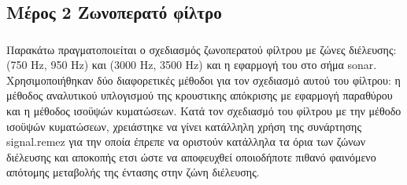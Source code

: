 \documentclass[letterpaper,10pt,english]{sphinxmanual}
\begin{document}
\noindent{}


\subsection*{Μέρος 2 Ζωνοπερατό φίλτρο}
\label{\detokenize{Exercise2_2:id1}}\label{\detokenize{Exercise2_2::doc}}

\subsubsection*{}
\label{\detokenize{Exercise2_2:hz-950-hz-3000-hz-3500-hz}}
\sphinxAtStartPar
Παρακάτω πραγματοποιείται ο σχεδιασμός ζωνοπερατού φίλτρου με ζώνες διέλευσης: (750 Hz, 950 Hz) και (3000 Hz, 3500 Hz) και η εφαρμογή του στο σήμα sonar. Χρησιμοποιήθηκαν δύο διαφορετικές μέθοδοι για τον σχεδιασμό αυτού του φίλτρου: η μέθοδος αναλυτικού υπλογισμού της κρουστικης απόκρισης με εφαρμογή παραθύρου και η μέθοδος ισοϋψών κυματώσεων. Κατά τον σχεδιασμό του φίλτρου με την μέθοδο ισοϋψών κυματώσεων, χρειάστηκε να γίνει κατάλληλη χρήση της συνάρτησης signal.remez για την οποία έπρεπε να οριστούν κατάλληλα τα όρια των ζώνων διέλευσης και αποκοπής ετσι ώστε να αποφευχθεί οποιοδήποτε πιθανό φαινόμενο απότομης μεταβολής της έντασης στην ζώνη διέλευσης.

\begin{sphinxVerbatim}[commandchars=\\\{\}]
 
   
 
   
 
   
   
\end{sphinxVerbatim}
\end{document}
